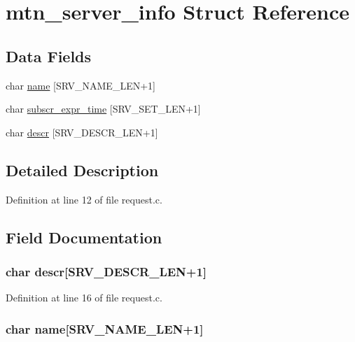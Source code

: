 \hypertarget{structmtn__server__info}{
\section{mtn\_\-server\_\-info Struct Reference}
\label{structmtn__server__info}
}
\subsection*{Data Fields}
\begin{DoxyCompactItemize}
\item 
char \hyperlink{structmtn__server__info_a50329dc3cb998f8c6804a38fc351ab49}{name} \mbox{[}SRV\_\-NAME\_\-LEN+1\mbox{]}
\item 
char \hyperlink{structmtn__server__info_af80c9d633febb0cbd22b911094051a39}{subscr\_\-expr\_\-time} \mbox{[}SRV\_\-SET\_\-LEN+1\mbox{]}
\item 
char \hyperlink{structmtn__server__info_a02cb5310ac28f380398a2e4e535b03e5}{descr} \mbox{[}SRV\_\-DESCR\_\-LEN+1\mbox{]}
\end{DoxyCompactItemize}


\subsection{Detailed Description}


Definition at line 12 of file request.c.



\subsection{Field Documentation}
\hypertarget{structmtn__server__info_a02cb5310ac28f380398a2e4e535b03e5}{
\subsubsection[{descr}]{\setlength{\rightskip}{0pt plus 5cm}char {\bf descr}\mbox{[}SRV\_\-DESCR\_\-LEN+1\mbox{]}}}
\label{structmtn__server__info_a02cb5310ac28f380398a2e4e535b03e5}


Definition at line 16 of file request.c.

\hypertarget{structmtn__server__info_a50329dc3cb998f8c6804a38fc351ab49}{
\subsubsection[{name}]{\setlength{\rightskip}{0pt plus 5cm}char {\bf name}\mbox{[}SRV\_\-NAME\_\-LEN+1\mbox{]}}}
\label{structmtn__server__info_a50329dc3cb998f8c6804a38fc351ab49}


